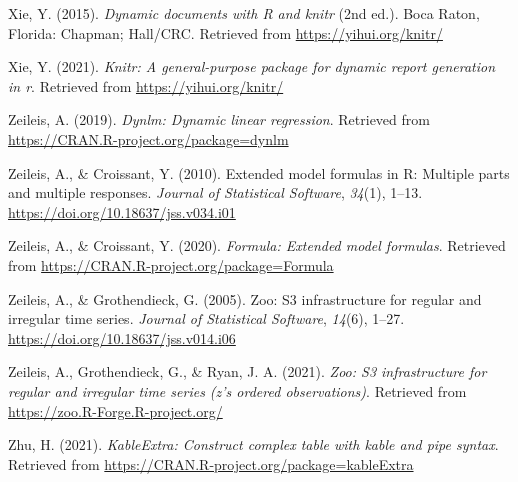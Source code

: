 \documentclass[
]{article}
\begin{document}
\leavevmode\hypertarget{ref-knitr2015}{}%
Xie, Y. (2015). \emph{Dynamic documents with R and knitr} (2nd ed.).
Boca Raton, Florida: Chapman; Hall/CRC. Retrieved from
\url{https://yihui.org/knitr/}

\leavevmode\hypertarget{ref-R-knitr}{}%
Xie, Y. (2021). \emph{Knitr: A general-purpose package for dynamic
report generation in r}. Retrieved from \url{https://yihui.org/knitr/}

\leavevmode\hypertarget{ref-R-dynlm}{}%
Zeileis, A. (2019). \emph{Dynlm: Dynamic linear regression}. Retrieved
from \url{https://CRAN.R-project.org/package=dynlm}

\leavevmode\hypertarget{ref-Formula2010}{}%
Zeileis, A., \& Croissant, Y. (2010). Extended model formulas in R:
Multiple parts and multiple responses. \emph{Journal of Statistical
Software}, \emph{34}(1), 1--13.
\url{https://doi.org/10.18637/jss.v034.i01}

\leavevmode\hypertarget{ref-R-Formula}{}%
Zeileis, A., \& Croissant, Y. (2020). \emph{Formula: Extended model
formulas}. Retrieved from
\url{https://CRAN.R-project.org/package=Formula}

\leavevmode\hypertarget{ref-zoo2005}{}%
Zeileis, A., \& Grothendieck, G. (2005). Zoo: S3 infrastructure for
regular and irregular time series. \emph{Journal of Statistical
Software}, \emph{14}(6), 1--27.
\url{https://doi.org/10.18637/jss.v014.i06}

\leavevmode\hypertarget{ref-R-zoo}{}%
Zeileis, A., Grothendieck, G., \& Ryan, J. A. (2021). \emph{Zoo: S3
infrastructure for regular and irregular time series (z's ordered
observations)}. Retrieved from \url{https://zoo.R-Forge.R-project.org/}

\leavevmode\hypertarget{ref-R-kableExtra}{}%
Zhu, H. (2021). \emph{KableExtra: Construct complex table with kable and
pipe syntax}. Retrieved from
\url{https://CRAN.R-project.org/package=kableExtra}
\end{document}
